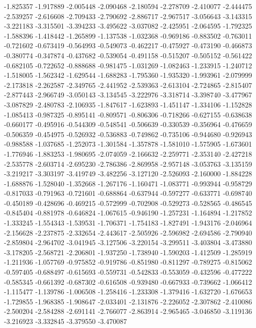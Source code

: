 -1.825357
-1.917889
-2.005448
-2.090468
-2.180594
-2.278709
-2.410077
-2.444475
-2.539257
-2.616608
-2.709433
-2.790692
-2.886717
-2.967517
-3.056643
-3.143315
-3.221183
-3.315501
-3.394233
-3.495622
-3.037082
-2.425951
-2.064595
-1.792325
-1.588396
-1.418442
-1.265899
-1.137538
-1.032368
-0.969186
-0.883502
-0.763011
-0.721602
-0.673419
-0.564993
-0.549073
-0.462217
-0.475927
-0.473190
-0.466873
-0.380774
-0.347874
-0.437682
-0.539054
-0.491158
-0.515207
-0.505152
-0.561422
-0.682105
-0.722652
-0.888688
-0.981475
-1.031269
-1.082463
-1.233915
-1.240712
-1.518005
-1.562342
-1.629544
-1.688283
-1.795360
-1.935320
-1.993961
-2.079999
-2.173818
-2.262587
-2.349765
-2.441952
-2.539363
-2.613104
-2.724865
-2.815407
-2.877443
-2.966749
-3.050143
-3.134545
-3.222976
-3.318714
-3.398740
-3.477967
-3.087829
-2.480783
-2.106935
-1.847617
-1.623893
-1.451147
-1.334106
-1.152828
-1.085413
-0.987325
-0.895141
-0.809571
-0.806306
-0.718266
-0.627155
-0.638638
-0.660177
-0.495916
-0.544309
-0.548541
-0.506639
-0.330539
-0.356964
-0.476659
-0.506359
-0.454975
-0.526932
-0.536883
-0.749862
-0.735106
-0.944680
-0.926943
-0.988588
-1.037685
-1.252073
-1.301584
-1.357878
-1.581010
-1.575905
-1.673601
-1.776946
-1.883253
-1.980695
-2.074059
-2.166632
-2.259771
-2.353140
-2.427218
-2.535778
-2.603714
-2.695230
-2.786386
-2.869958
-2.957148
-3.053763
-3.135159
-3.219217
-3.303197
-3.419749
-3.482256
-3.127120
-2.526093
-2.160000
-1.884228
-1.688876
-1.528040
-1.352668
-1.267176
-1.160471
-1.083771
-0.993944
-0.958729
-0.817033
-0.791963
-0.721601
-0.688864
-0.637944
-0.597277
-0.633771
-0.698740
-0.450189
-0.428696
-0.469215
-0.572999
-0.702908
-0.529273
-0.528565
-0.486545
-0.845404
-0.881978
-0.646824
-1.067615
-0.946190
-1.257231
-1.164894
-1.217852
-1.333245
-1.554343
-1.539531
-1.706371
-1.754183
-1.827491
-1.943176
-2.046964
-2.156628
-2.237875
-2.332654
-2.443617
-2.505926
-2.596982
-2.694586
-2.790940
-2.859804
-2.964702
-3.041945
-3.127506
-3.220154
-3.299511
-3.403804
-3.473880
-3.178205
-2.568721
-2.206801
-1.937250
-1.738940
-1.590203
-1.412509
-1.285919
-1.211936
-1.057769
-0.975852
-0.919786
-0.851980
-0.811297
-0.789275
-0.815062
-0.597405
-0.688497
-0.615693
-0.559731
-0.542833
-0.553059
-0.432596
-0.477222
-0.585345
-0.661392
-0.687302
-0.616508
-0.939480
-0.667933
-0.739662
-1.066412
-1.115477
-1.139786
-1.006508
-1.258416
-1.233308
-1.379416
-1.632720
-1.676653
-1.729855
-1.968385
-1.908647
-2.033401
-2.131876
-2.226052
-2.307862
-2.410086
-2.500204
-2.584288
-2.691141
-2.766077
-2.863914
-2.965465
-3.046850
-3.119136
-3.216923
-3.332845
-3.379550
-3.470087
